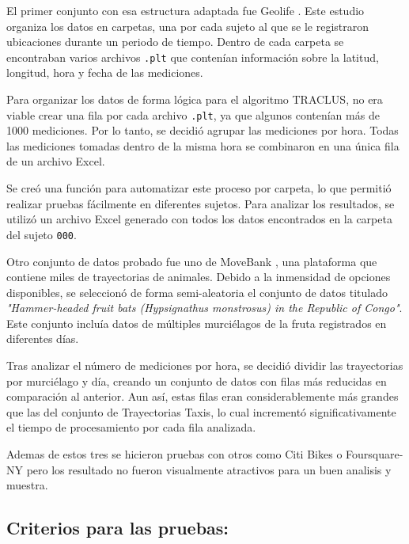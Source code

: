 El primer conjunto con esa estructura adaptada fue Geolife \cite{geolife_trajectories}. Este estudio organiza los datos en carpetas, una por cada sujeto al que se le registraron ubicaciones durante un periodo de tiempo. Dentro de cada carpeta se encontraban varios archivos \texttt{.plt} que contenían información sobre la latitud, longitud, hora y fecha de las mediciones. 

Para organizar los datos de forma lógica para el algoritmo TRACLUS, no era viable crear una fila por cada archivo \texttt{.plt}, ya que algunos contenían más de 1000 mediciones. Por lo tanto, se decidió agrupar las mediciones por hora. Todas las mediciones tomadas dentro de la misma hora se combinaron en una única fila de un archivo Excel.

Se creó una función para automatizar este proceso por carpeta, lo que permitió realizar pruebas fácilmente en diferentes sujetos. Para analizar los resultados, se utilizó un archivo Excel generado con todos los datos encontrados en la carpeta del sujeto \texttt{000}.

Otro conjunto de datos probado fue uno de MoveBank \cite{movebank}, una plataforma que contiene miles de trayectorias de animales. Debido a la inmensidad de opciones disponibles, se seleccionó de forma semi-aleatoria el conjunto de datos titulado \textit{"Hammer-headed fruit bats (Hypsignathus monstrosus) in the Republic of Congo"}. Este conjunto incluía datos de múltiples murciélagos de la fruta registrados en diferentes días. 

Tras analizar el número de mediciones por hora, se decidió dividir las trayectorias por murciélago y día, creando un conjunto de datos con filas más reducidas en comparación al anterior. Aun así, estas filas eran considerablemente más grandes que las del conjunto de Trayectorias Taxis, lo cual incrementó significativamente el tiempo de procesamiento por cada fila analizada.

Ademas de estos tres se hicieron pruebas con otros como Citi Bikes \cite{citybike} o Foursquare-NY \cite{foursquare} pero los resultado no fueron visualmente atractivos para un buen analisis y muestra.

\subsection{Criterios para las pruebas:}

